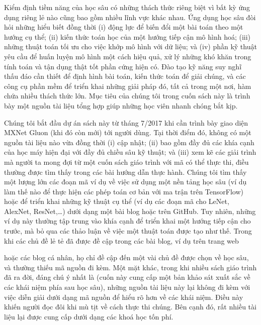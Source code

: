 \documentclass[letterpaper,11pt,english]{sphinxmanual}
\begin{document}
Kiểm định tiềm năng của học sâu có những thách thức riêng biệt vì bất kỳ
ứng dụng riêng lẻ nào cũng bao gồm nhiều lĩnh vực khác nhau. Ứng dụng
học sâu đòi hỏi những hiểu biết đồng thời (i) động lực để biến đổi một
bài toán theo một hướng cụ thể; (ii) kiến thức toán học của một hướng
tiếp cận mô hình hoá; (iii) những thuật toán tối ưu cho việc khớp mô
hình với dữ liệu; và (iv) phần kỹ thuật yêu cầu để huấn luyện mô hình
một cách hiệu quả, xử lý những khó khăn trong tính toán và tận dụng thật
tốt phần cứng hiện có. Đào tạo kỹ năng suy nghĩ thấu đáo cần thiết để
định hình bài toán, kiến thức toán để giải chúng, và các công cụ phần
mềm để triển khai những giải pháp đó, tất cả trong một nơi, hàm chứa
nhiều thách thức lớn. Mục tiêu của chúng tôi trong cuốn sách này là
trình bày một nguồn tài liệu tổng hợp giúp những học viên nhanh chóng
bắt kịp.



Chúng tôi bắt đầu dự án sách này từ tháng 7/2017 khi cần trình bày giao
diện MXNet Gluon (khi đó còn mới) tới người dùng. Tại thời điểm đó,
không có một nguồn tài liệu nào vừa đồng thời (i) cập nhật; (ii) bao gồm
đầy đủ các khía cạnh của học máy hiện đại với đầy đủ chiều sâu kỹ thuật;
và (iii) xem kẽ các giải trình mà người ta mong đợi từ một cuốn sách
giáo trình với mã có thể thực thi, điều thường được tìm thấy trong các
bài hướng dẫn thực hành. Chúng tôi tìm thấy một lượng lớn các đoạn mã ví
dụ về việc sử dụng một nền tảng học sâu (ví dụ làm thế nào để thực hiện
các phép toán cơ bản với ma trận trên TensorFlow) hoặc để triển khai
những kỹ thuật cụ thể (ví dụ các đoạn mã cho LeNet, AlexNet, ResNet,…)
dưới dạng một bài blog hoặc trên GitHub. Tuy nhiên, những ví dụ này
thường tập trung vào khía cạnh  để triển khai một hướng
tiếp cận cho trước, mà bỏ qua các thảo luận về việc  một thuật
toán được tạo như thế. Trong khi các chủ đề lẻ tẻ đã được đề cập trong
các bài blog, ví dụ trên trang web %
\begin{footnote}[17]\sphinxAtStartFootnote
{}
%
\end{footnote} hoặc
các blog cá nhân, họ chỉ đề cập đến một vài chủ đề được chọn về học sâu,
và thường thiếu mã nguồn đi kèm. Một mặt khác, trong khi nhiều sách giáo
trình đã ra đời, đáng chú ý nhất là
 (cuốn này cung cấp một bản
khảo sát xuất sắc về các khái niệm phía sau học sâu), những nguồn tài
liệu này lại không đi kèm với việc diễn giải dưới dạng mã nguồn để hiểu
rõ hơn về các khái niệm. Điều này khiến người đọc đôi khi mù tịt về cách
thực thi chúng. Bên cạnh đó, rất nhiều tài liệu lại được cung cấp dưới
dạng các khoá học tốn phí.
\end{document}
